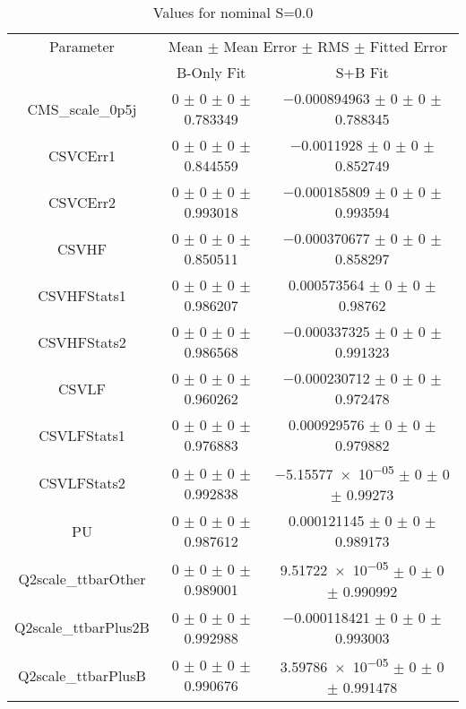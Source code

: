 \begin{table}
\centering
\caption{Values for nominal S=0.0}
\begin{tabular}{ccc}
\toprule
Parameter & \multicolumn{2}{c}{Mean $\pm$ Mean Error $\pm$ RMS $\pm$ Fitted Error}\\
 & B-Only Fit & S+B Fit\\
\midrule
CMS\_scale\_0p5j & \num{0} $\pm$ \num{0} $\pm$ \num{0} $\pm$ \num{0.783349} & \num{-0.000894963} $\pm$ \num{0} $\pm$ \num{0} $\pm$ \num{0.788345}\\
CSVCErr1 & \num{0} $\pm$ \num{0} $\pm$ \num{0} $\pm$ \num{0.844559} & \num{-0.0011928} $\pm$ \num{0} $\pm$ \num{0} $\pm$ \num{0.852749}\\
CSVCErr2 & \num{0} $\pm$ \num{0} $\pm$ \num{0} $\pm$ \num{0.993018} & \num{-0.000185809} $\pm$ \num{0} $\pm$ \num{0} $\pm$ \num{0.993594}\\
CSVHF & \num{0} $\pm$ \num{0} $\pm$ \num{0} $\pm$ \num{0.850511} & \num{-0.000370677} $\pm$ \num{0} $\pm$ \num{0} $\pm$ \num{0.858297}\\
CSVHFStats1 & \num{0} $\pm$ \num{0} $\pm$ \num{0} $\pm$ \num{0.986207} & \num{0.000573564} $\pm$ \num{0} $\pm$ \num{0} $\pm$ \num{0.98762}\\
CSVHFStats2 & \num{0} $\pm$ \num{0} $\pm$ \num{0} $\pm$ \num{0.986568} & \num{-0.000337325} $\pm$ \num{0} $\pm$ \num{0} $\pm$ \num{0.991323}\\
CSVLF & \num{0} $\pm$ \num{0} $\pm$ \num{0} $\pm$ \num{0.960262} & \num{-0.000230712} $\pm$ \num{0} $\pm$ \num{0} $\pm$ \num{0.972478}\\
CSVLFStats1 & \num{0} $\pm$ \num{0} $\pm$ \num{0} $\pm$ \num{0.976883} & \num{0.000929576} $\pm$ \num{0} $\pm$ \num{0} $\pm$ \num{0.979882}\\
CSVLFStats2 & \num{0} $\pm$ \num{0} $\pm$ \num{0} $\pm$ \num{0.992838} & \num{-5.15577e-05} $\pm$ \num{0} $\pm$ \num{0} $\pm$ \num{0.99273}\\
PU & \num{0} $\pm$ \num{0} $\pm$ \num{0} $\pm$ \num{0.987612} & \num{0.000121145} $\pm$ \num{0} $\pm$ \num{0} $\pm$ \num{0.989173}\\
Q2scale\_ttbarOther & \num{0} $\pm$ \num{0} $\pm$ \num{0} $\pm$ \num{0.989001} & \num{9.51722e-05} $\pm$ \num{0} $\pm$ \num{0} $\pm$ \num{0.990992}\\
Q2scale\_ttbarPlus2B & \num{0} $\pm$ \num{0} $\pm$ \num{0} $\pm$ \num{0.992988} & \num{-0.000118421} $\pm$ \num{0} $\pm$ \num{0} $\pm$ \num{0.993003}\\
Q2scale\_ttbarPlusB & \num{0} $\pm$ \num{0} $\pm$ \num{0} $\pm$ \num{0.990676} & \num{3.59786e-05} $\pm$ \num{0} $\pm$ \num{0} $\pm$ \num{0.991478}\\

\end{tabular}
\end{table}
